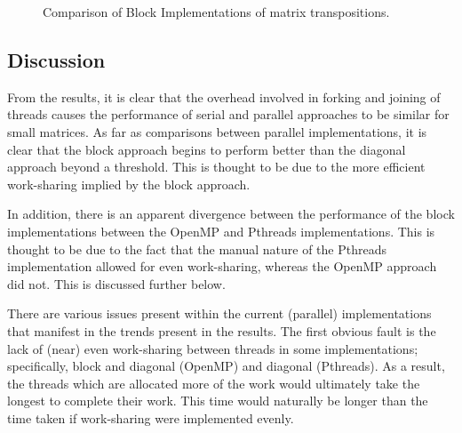 \documentclass[journal,10pt]{IEEEtran}
\begin{document}
\begin{figure}[H]
  \begin{center}
    \caption{Comparison of Block Implementations of matrix transpositions.}
  \end{center}
\end{figure}


\subsection{Discussion}

From the results, it is clear that the overhead involved in forking and joining of threads causes the performance of serial and parallel approaches to be similar for small matrices. As far as comparisons between parallel implementations, it is clear that the block approach begins to perform better than the diagonal approach beyond a threshold. This is thought to be due to the more efficient work-sharing implied by the block approach. 

In addition, there is an apparent divergence between the performance of the block implementations between the OpenMP and Pthreads implementations. This is thought to be due to the fact that the manual nature of the Pthreads implementation allowed for even work-sharing, whereas the OpenMP approach did not. This is discussed further below.


There are various issues present within the current (parallel) implementations that manifest in the trends present in the results. The first obvious fault is the lack of (near) even work-sharing between threads in some implementations; specifically, block and diagonal (OpenMP) and diagonal (Pthreads). As a result, the threads which are allocated more of the work would ultimately take the longest to complete their work. This time would naturally be longer than the time taken if work-sharing were implemented evenly.
\end{document}
